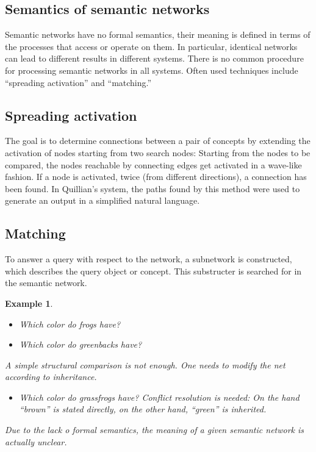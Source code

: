 \documentclass[openany]{scrbook}
\theoremstyle{break}
\theoremstyle{nonumberbreak}
\newtheorem{Example}{Example}
\theoremstyle{nonumberplain}
\theoremstyle{nonumberbreak}
\begin{document}
\subsection{Semantics of semantic networks}
Semantic networks have no formal semantics, their meaning is defined
in terms of the processes that access or operate on them. In
particular, identical networks can lead to different results in
different systems. There is no common procedure for processing
semantic networks in all systems. Often used techniques include
``spreading activation'' and ``matching.''

\subsection{Spreading activation}
The goal is to determine connections between a pair of concepts by
extending the activation of nodes starting from two search nodes:
Starting from the nodes to be compared, the nodes reachable by
connecting edges get activated in a wave-like fashion. If a node is
activated, twice (from different directions), a connection has been
found. In Quillian's system, the paths found by this method were used
to generate an output in a simplified natural language.

\subsection{Matching}
To answer a query with respect to the network, a subnetwork is
constructed, which describes the query object or concept. This
substructer is searched for in the semantic network.

\begin{Example}
  \begin{itemize}
  \item Which color do frogs have?
  \item Which color do greenbacks have?
  \end{itemize}

  A simple structural comparison is not enough. One needs to modify
  the net according to inheritance.
  \begin{itemize}
  \item Which color do grassfrogs have?
    Conflict resolution is needed: On the hand ``brown'' is stated
    directly, on the other hand, ``green'' is inherited.
  \end{itemize}

  Due to the lack o formal semantics, the meaning of a given semantic
  network is actually unclear.
\end{Example}
\end{document}
